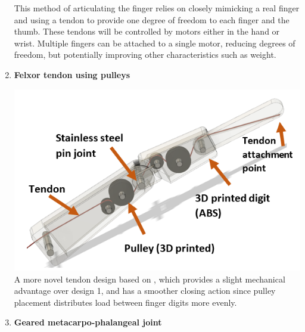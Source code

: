 \documentclass[11pt,3p]{report}
\begin{document}
\begin{multicols}{2}
\begin{enumerate}[noitemsep]
{				This method of articulating the finger relies on closely mimicking a real finger and using a tendon to provide one degree of freedom to each finger and the thumb. These tendons will be controlled by motors either in the hand or wrist. Multiple fingers can be attached to a single motor, reducing degrees of freedom, but potentially improving other characteristics such as weight.
				
			}
			\item \textbf{Felxor tendon using pulleys} {
							
				\includegraphics[scale=0.5]{pulley.PNG}
				A more novel tendon design based on \cite{mottardunderactuated}, which provides a slight mechanical advantage over design 1, and has a smoother closing action since pulley placement distributes load between finger digits more evenly. 
			}		
			
			\item \textbf{Geared metacarpo-phalangeal joint} {
			
}
\end{enumerate}
\end{multicols}
\end{document}
